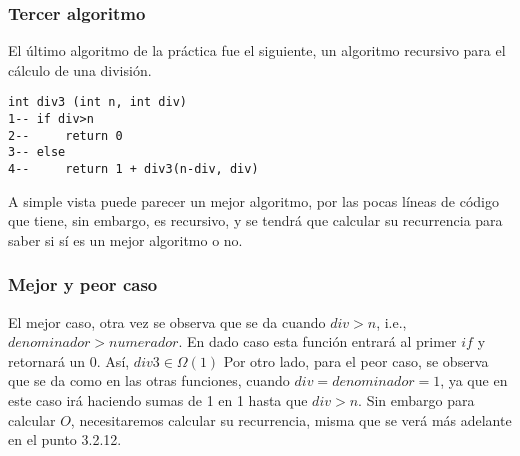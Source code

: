 \documentclass[12pt,twoside]{article}
\begin{document}
\subsubsection{Tercer algoritmo}
El último algoritmo de la práctica fue el siguiente, un algoritmo recursivo para el cálculo de una división.
\begin{lstlisting}
int div3 (int n, int div)
1-- if div>n
2--     return 0
3-- else
4--     return 1 + div3(n-div, div)
\end{lstlisting}
A simple vista puede parecer un mejor algoritmo, por las pocas líneas de código que tiene, sin embargo, es recursivo, y se tendrá que calcular su recurrencia para saber si sí es un mejor algoritmo o no.
\subsubsection{Mejor y peor caso}
El mejor caso, otra vez se observa que se da cuando $div > n$, i.e., $denominador > numerador$. En dado caso esta función entrará al primer $if$ y retornará un $0$. Así,\newline\newline
$div3 \in \Omega(1)$\newline\newline
Por otro lado, para el peor caso, se observa que se da como en las otras funciones, cuando $div = denominador = 1$, ya que en este caso irá haciendo sumas de 1 en 1 hasta que $div > n$. Sin embargo para calcular $O$, necesitaremos calcular su recurrencia, misma que se verá más adelante en el punto 3.2.12.
\end{document}
